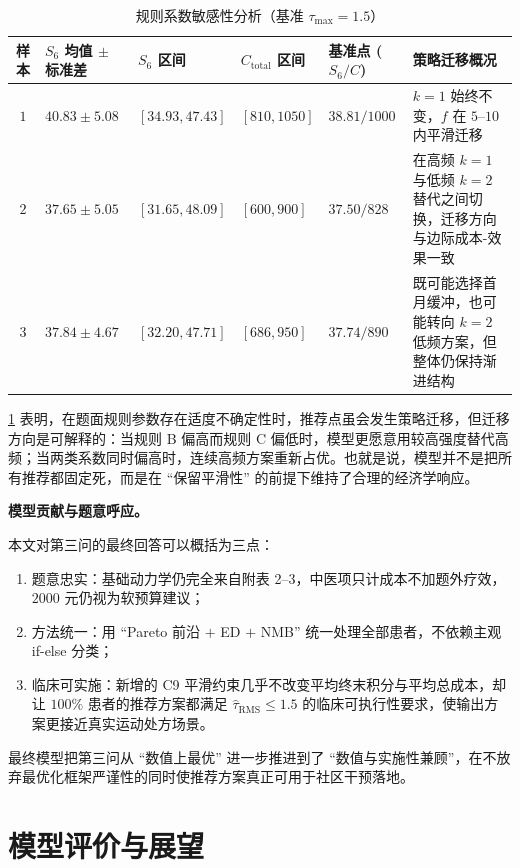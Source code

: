 \documentclass{MathorCupmodeling}
\providecommand{\tightlist}{%
  \setlength{\itemsep}{0pt}\setlength{\parskip}{0pt}}
\begin{document}
\begin{table}[H]
\centering\small
\caption{规则系数敏感性分析（基准 $\tau_{\max}=1.5$）}\label{tab:q3-rule-sens}
\begin{tabular}{@{}c l l l l p{4.2cm}@{}}
\toprule
样本 & $S_6$ 均值 $\pm$ 标准差 & $S_6$ 区间 & $C_{\text{total}}$ 区间 & 基准点 ($S_6/C$) & 策略迁移概况 \\
\midrule
$1$ & $40.83\pm 5.08$ & $[34.93, 47.43]$ & $[810, 1050]$ & $38.81/1000$ & $k=1$ 始终不变，$f$ 在 $5$--$10$ 内平滑迁移 \\
$2$ & $37.65\pm 5.05$ & $[31.65, 48.09]$ & $[600, 900]$ & $37.50/828$ & 在高频 $k=1$ 与低频 $k=2$ 替代之间切换，迁移方向与边际成本-效果一致 \\
$3$ & $37.84\pm 4.67$ & $[32.20, 47.71]$ & $[686, 950]$ & $37.74/890$ & 既可能选择首月缓冲，也可能转向 $k=2$ 低频方案，但整体仍保持渐进结构 \\
\bottomrule
\end{tabular}
\end{table}

\cref{tab:q3-rule-sens} 表明，在题面规则参数存在适度不确定性时，推荐点虽会发生策略迁移，但迁移方向是可解释的：当规则 B 偏高而规则 C 偏低时，模型更愿意用较高强度替代高频；当两类系数同时偏高时，连续高频方案重新占优。也就是说，模型并不是把所有推荐都固定死，而是在 ``保留平滑性'' 的前提下维持了合理的经济学响应。

\noindent\textbf{模型贡献与题意呼应。}

本文对第三问的最终回答可以概括为三点：
\begin{enumerate}
\def\labelenumi{(\arabic{enumi})}
\tightlist
\item 题意忠实：基础动力学仍完全来自附表 2--3，中医项只计成本不加题外疗效，$2000$ 元仍视为软预算建议；
\item 方法统一：用 ``Pareto 前沿 $+$ ED $+$ NMB'' 统一处理全部患者，不依赖主观 if-else 分类；
\item 临床可实施：新增的 C9 平滑约束几乎不改变平均终末积分与平均总成本，却让 $100\%$ 患者的推荐方案都满足 $\widehat\tau_{\mathrm{RMS}}\le 1.5$ 的临床可执行性要求，使输出方案更接近真实运动处方场景。
\end{enumerate}
最终模型把第三问从 ``数值上最优'' 进一步推进到了 ``数值与实施性兼顾''，在不放弃最优化框架严谨性的同时使推荐方案真正可用于社区干预落地。

\section{模型评价与展望}
\end{document}
